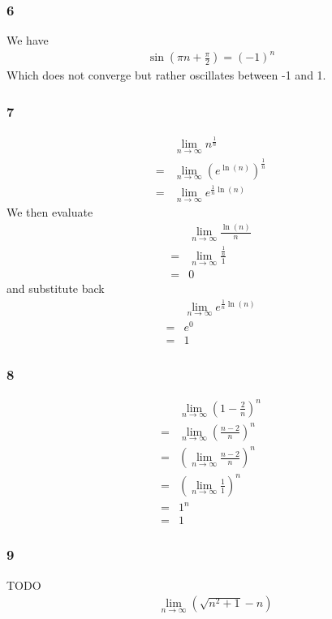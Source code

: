 \documentclass[12pt]{article}
\newcommand{\round}[1]{\left(       #1 \right)      }
\begin{document}
\subsubsection*{6}
We have
\begin{align*}
    \sin\round{\pi n + \frac{\pi}{2}} = (-1)^n
\end{align*}
Which does not converge but rather oscillates between -1 and 1.

\subsubsection*{7}
\begin{align*}
     & \lim_{n\to\infty} n^\frac{1}{n} \\
    =& \lim_{n\to\infty} \round{e^{\ln(n)}}^\frac{1}{n} \\
    =& \lim_{n\to\infty} e^{\frac{1}{n} \ln(n)}
\end{align*}
We then evaluate
\begin{align*}
     & \lim_{n\to\infty} \frac{\ln(n)}{n} \\
    =& \lim_{n\to\infty} \frac{\frac{1}{n}}{1} \\
    =& 0
\end{align*}
and substitute back
\begin{align*}
     & \lim_{n\to\infty} e^{\frac{1}{n} \ln(n)} \\
    =& e^0 \\
    =& 1
\end{align*}

\subsubsection*{8}
\begin{align*}
     & \lim_{n\to\infty} \round{1 - \frac{2}{n}}^n \\
    =& \lim_{n\to\infty} \round{\frac{n-2}{n}}^n \\
    =& \round{\lim_{n\to\infty} \frac{n-2}{n}}^n \\
    =& \round{\lim_{n\to\infty} \frac{1}{1}}^n \\
    =& 1^n \\
    =& 1
\end{align*}

\subsubsection*{9}
TODO
\begin{align*}
     & \lim_{n\to\infty} \round{\sqrt{n^2 + 1} - n} \\
\end{align*}
\end{document}
